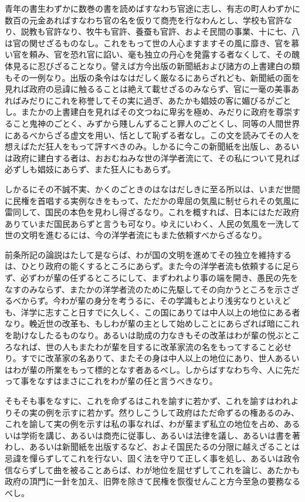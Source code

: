 \documentclass[a4paper, platex, dvipdfmx]{jsarticle}
\begin{document}
青年の書生わずかに数巻の書を読めばすなわち官途に志し、有志の町人わずかに数百の元金あればすなわち官の名を仮りて商売を行なわんとし、学校も官許なり、説教も官許なり、牧牛も官許、養蚕も官許、およそ民間の事業、十に七、八は官の関せざるものなし。これをもって世の人心ますますその風に靡き、官を慕い官を頼み、官を恐れ官に諂い、毫も独立の丹心を発露する者なくして、その醜体見るに忍びざることなり。譬えば方今出版の新聞紙および諸方の上書建白の類もその一例なり。出版の条令はなはだしく厳なるにあらざれども、新聞紙の面を見れば政府の忌諱に触るることは絶えて載せざるのみならず、官に一毫の美事あればみだりにこれを称誉してその実に過ぎ、あたかも娼妓の客に媚びるがごとし。またかの上書建白を見ればその文つねに卑劣を極め、みだりに政府を尊崇すること鬼神のごとく、みずから賤しんずること罪人のごとくし、同等の人間世界にあるべからざる虚文を用い、恬として恥ずる者なし。この文を読みてその人を想えばただ狂人をもって評すべきのみ。しかるに今この新聞紙を出版し、あるいは政府に建白する者は、おおむねみな世の洋学者流にて、その私について見れば必ずしも娼妓にあらず、また狂人にもあらず。

しかるにその不誠不実、かくのごときのはなはだしきに至る所以は、いまだ世間に民権を首唱する実例なきをもって、ただかの卑屈の気風に制せられその気風に雷同して、国民の本色を見わし得ざるなり。これを概すれば、日本にはただ政府ありていまだ国民あらずと言うも可なり。ゆえにいわく、人民の気風を一洗して世の文明を進むるには、今の洋学者流にもまた依頼すべからざるなり。

前条所記の論説はたして是ならば、わが国の文明を進めてその独立を維持するは、ひとり政府の能くするところにあらず。また今の洋学者流も依頼するに足らず、必ずわが輩の任ずるところにして、まずわれより事の端を開き、愚民の先をなすのみならず、またかの洋学者流のために先駆してその向かうところを示さざるべからず。今わが輩の身分を考うるに、その学識もとより浅劣なりといえども、洋学に志すこと日すでに久しく、この国にありては中人以上の地位にある者なり。輓近世の改革も、もしわが輩の主として始めしことにあらざれば暗にこれを助けなしたるものなり。あるいは助成の力なきもその改革はわが輩の悦ぶところなれば、世の人もまたわが輩を目するに改革家流の名をもってすること必せり。すでに改革家の名ありて、またその身は中人以上の地位にあり、世人あるいはわが輩の所業をもって標的となす者あるべし。しからばすなわち今、人に先だって事をなすはまさにこれをわが輩の任と言うべきなり。

そもそも事をなすに、これを命ずるはこれを諭すに若かず、これを諭すはわれよりその実の例を示すに若かず。然りしこうして政府はただ命ずるの権あるのみ、これを諭して実の例を示すは私の事なれば、わが輩まず私立の地位を占め、あるいは学術を講じ、あるいは商売に従事し、あるいは法律を議し、あるいは書を著わし、あるいは新聞紙を出版するなど、およそ国民たるの分限に越えざることは忌諱を憚らずしてこれを行ない、固く法を守りて正しく事を処し、あるいは政令信ならずして曲を被ることあらば、わが地位を屈せずしてこれを論じ、あたかも政府の頂門に一針を加え、旧弊を除きて民権を恢復せんこと方今至急の要務なるべし。
\end{document}
